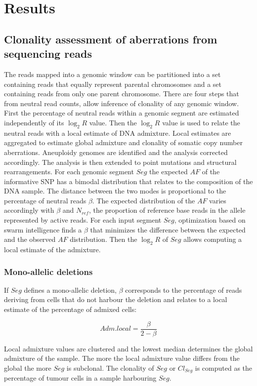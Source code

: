 \section{Results}

	\subsection{Clonality assessment of aberrations from sequencing reads}
	The reads mapped into a genomic window can be partitioned into a set containing reads that equally represent parental chromosomes and a set containing reads from only one parent chromosome.
	There are four steps that from neutral read counts, allow inference of clonality of any genomic window.
	First the percentage of neutral reads within a genomic segment are estimated independently of its $\log_2 R$ value.
	Then the $\log_2 R$ value is used to relate the neutral reads with a local estimate of DNA admixture.
	Local estimates are aggregated to estimate global admixture and clonality of somatic copy number aberrations.
	Aneuploidy genomes are identified and the analysis corrected accordingly.
	The analysis  is then extended to point mutations and structural rearrangements.
	For each genomic segment $Seg$ the expected $AF$ of the informative SNP has a bimodal distribution that relates to the composition of the DNA sample.
	The distance between the two modes is proportional to the percentage of neutral reads $\beta$.
	The expected distribution of the $AF$ varies accordingly with $\beta$ and $N_{ref}$, the proportion of reference base reads in the allele represented by active reads.
	For each input segment $Seg$, optimization based on swarm intelligence finds a $\beta$ that minimizes the difference between the expected and the observed $AF$ distribution.
	Then the $\log_2 R$ of $Seg$ allows computing a local estimate of the admixture.

		\subsubsection{Mono-allelic deletions}
		If $Seg$ defines a mono-allelic deletion, $\beta$ corresponds to the percentage of reads deriving from cells that do not harbour the deletion and relates to a local estimate of the percentage of admixed cells:

		$$Adm.local = \frac{\beta}{2-\beta}$$

		Local admixture values are clustered and the lowest median determines the global admixture of the sample.
		The more the local admixture value differs from the global the more $Seg$ is subclonal.
		The clonality of $Seg$ or $Cl_{Seg}$ is computed as the percentage of tumour cells in a sample harbouring $Seg$.


